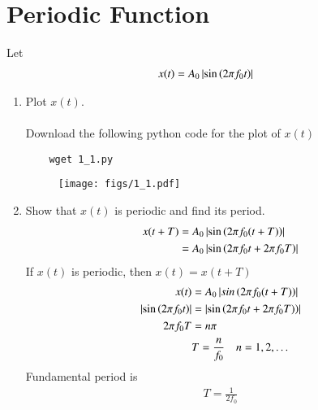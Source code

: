 \documentclass[journal,12pt,twocolumn]{IEEEtran}
\renewcommand\thesection{\arabic{section}}
\begin{document}
\section{Periodic Function}
Let 
\begin{align}
	x(t) &= A_0\left\vert\sin\left(2\pi f_0 t\right)\right\vert
	\label{eq:10-orig-diff-def}
\end{align}
\begin{enumerate}[label=\thesection.\arabic*
,ref=\thesection.\theenumi]

\item Plot $x(t)$. \\
\solution \\
Download the following python code for the plot of $x(t)$
\begin{lstlisting}
	wget 1_1.py
\end{lstlisting}
\begin{figure}[!ht]
	\centering
	\texttt{[image: figs/1\_1.pdf]}
	\caption{}
	\label{fig:x(t)}
\end{figure}


\item Show that $x(t)$ is periodic and find its period.
\solution 
\begin{align}
	x(t + T) &= A_{0} \left\vert\sin{\ensuremath{\left(2 \pi f_0 (t + T)\right)}}\right\vert \\
		 &= A_{0} \left\vert\sin{\ensuremath{\left(2 \pi f_0 t + 2 \pi f_0 T\right)}}\right\vert 
\end{align}
If $x(t)$ is periodic, then $ x(t) = x(t + T)$
\begin{align}
	x(t) &= A_{0} \left\vert sin\left(2 \pi f_0 (t + T)\right)\right\vert \\
	\left\vert\sin{\ensuremath{\left(2 \pi f_0 t\right)}}\right\vert &= \left\vert\sin{\ensuremath{\left(2 \pi f_0 t + 2 \pi f_0 T)\right)}}\right\vert \\
	2 \pi f_0 T &= n \pi \\
		    &T = \frac{n}{f_0} \quad n = 1, 2, \dots 
\end{align}
Fundamental period is
\begin{align}
	T = \frac{1}{2 f_0}
\end{align}

\end{enumerate}
\end{document}

